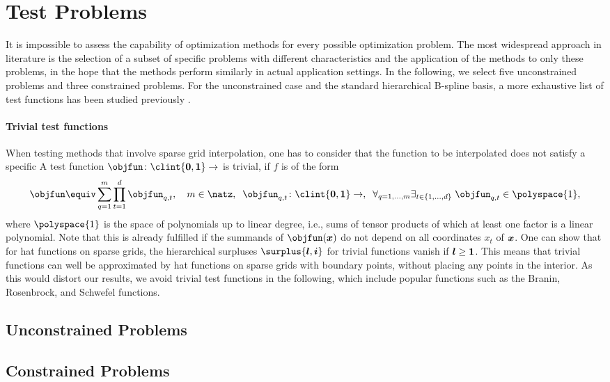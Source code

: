 \section{Test Problems}
\label{sec:52testProblems}

It is impossible to assess the capability of optimization methods
for every possible optimization problem.
The most widespread approach in literature
is the selection of a subset of specific problems
with different characteristics  and
the application of the methods to only these problems,
in the hope that the methods perform similarly in
actual application settings.
In the following, we select five unconstrained problems
and three constrained problems.
For the unconstrained case and the standard hierarchical
B-spline basis, a more exhaustive list of test functions has been
studied previously \cite{Valentin14Hierarchische}.

\paragraph{Trivial test functions}

When testing methods that involve sparse grid interpolation,
one has to consider that the function to be interpolated
does not satisfy a specific 
A test function $\objfun\colon \clint{\*0, \*1} \to \real$ is trivial, if
$f$ is of the form
\begin{equation}
  \objfun \equiv \sum_{q=1}^m \prod_{t=1}^d \objfun_{q,t},\quad
  m \in \natz,\;\;
  \objfun_{q,t}\colon \clint{\*0, \*1} \to \real,\;\;
  \faex{q = 1, \dotsc, m}{t \in \{1, \dotsc, d\}}{
    \objfun_{q,t} \in \polyspace{1},
  }
\end{equation}
where $\polyspace{1}$ is the space of polynomials up to linear degree,
i.e., sums of tensor products of which at least one factor is a
linear polynomial.
Note that this is already fulfilled if the summands of $\objfun(\*x)$
do not depend on all coordinates $x_t$ of ${\boldsymbol{x}}$.
One can show that for hat functions on sparse grids,
the hierarchical surpluses $\surplus{\*l,\*i}$ for trivial functions
vanish if ${\boldsymbol{l}} \ge {\boldsymbol{1}}$.
This means that trivial functions can well be approximated by hat functions
on sparse grids with boundary points, without placing any points
in the interior.
As this would distort our results,
we avoid trivial test functions in the following,
which include popular functions such as the
Branin, Rosenbrock, and Schwefel functions.



\subsection{Unconstrained Problems}
\label{sec:511unconstrainedProblems}


\blindtext{}



\subsection{Constrained Problems}
\label{sec:512constrainedProblems}

\blindtext{}
